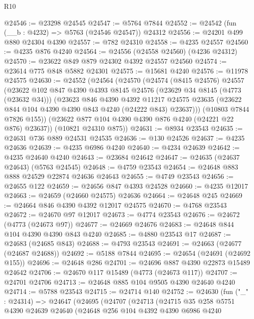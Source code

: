 \begin{lexlean}{R10}
\begin{coremodule}
@24546 := @23298 @24545
@24547 := @5764 @7844
@24552 := @24542 (fun (__b : @4232) => @5763 (@24546 @24547)) @24312
@24556 := @24201 @499 @880 @24304 @4390
@24557 := @782 @24310
@24558 := @4235 @24557
@24560 := @4235 @876 @4240
@24564 := @24556 (@24558 @24560) (@4236 @24312)
@24570 := @23622 @849 @879 @24302 @4392 @24557 @24560
@24574 := @23614 @775 @848 @5882 @24301
@24575 := @15681 @4240
@24576 := @11978 @24575
@24630 := @24552
    (@24564
      (@24570
        (@24574
          (@8415 @24576)
          @24557
          (@23622
            @102
            @847
            @4390
            @4393
            @8145
            @24576
            (@23629 @34 @8145 (@4773 (@23632 @34)))
            (@23623
              @846
              @4390
              @4392
              @11217
              @24575
              @23635
              (@23622 @844 @104 @4390 @4390 @843 @4240 (@24222 @843) @23637)))
          (@10803 @7844 @7826 @155))
        (@23622 @877 @104 @4390 @4390 @876 @4240 (@24221 @22 @876) @23637))
      (@10821 @24310 @875))
@24631 := @8934 @23543
@24635 := @24631 @736 @889 @24531 @24535
@24636 := @130 @24526
@24637 := @4235 @24636
@24639 := @4235 @6986 @4240
@24640 := @4234 @24639
@24642 := @4235 @24640 @4240
@24643 := @23684 @24642
@24647 := @24635 (@24637 @24643) (@5763 @24545)
@24648 := @4759 @23543
@24654 := @24648 @883 @888 @24529 @22874 @24636 @24643
@24655 := @4749 @23543
@24656 := @24655 @122
@24659 := @24656 @847 @4393 @24528
@24660 := @4235 @12017
@24663 := @24659 (@24660 @24575) @24636
@24664 := @24648 @245
@24669 := @24664 @846 @4390 @4392 @12017 @24575
@24670 := @4768 @23543
@24672 := @24670 @97 @12017
@24673 := @4774 @23543
@24676 := @24672 (@4773 (@24673 @97))
@24677 := @24669 @24676
@24683 := @24648 @844 @104 @4390 @4390 @843 @4240
@24685 := @4880 @23543 @17
@24687 := @24683 (@24685 @843)
@24688 := @4793 @23543
@24691 := @24663 (@24677 (@24687 @24688))
@24692 := @5188 @7844
@24695 := @24654 (@24691 (@24692 @155))
@24696 := @24648 @286
@24701 := @24696 @887 @4390 @22873 @15489 @24642
@24706 := @24670 @117 @15489 (@4773 (@24673 @117))
@24707 := @24701 @24706
@24713 := @24648 @885 @104 @9505 @4390 @24640 @4240
@24714 := @5788 @23543
@24715 := @24714 @140
@24752 := @24630
    (fun ("_" : @24314) =>
    @24647
      (@24695
        (@24707
          (@24713
            (@24715
              @35
              @258
              @5751
              @4390
              @24639
              @24640
              (@24648
                @256
                @104
                @4392
                @4390
                @6986
                @4240

\end{coremodule}
\end{lexlean}
